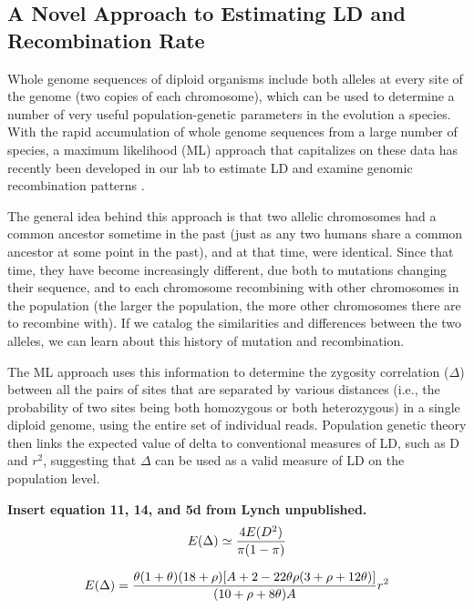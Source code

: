 \documentclass{sig-alternate}
\begin{document}
\subsection{ A Novel Approach to Estimating LD and Recombination Rate}\label{sec:migration}

Whole genome sequences of diploid organisms include both alleles at every site of the genome (two copies of each chromosome), which can be used to determine a number of very useful population-genetic parameters in the evolution a species. With the rapid accumulation of whole genome sequences from a large number of species, a maximum likelihood (ML) approach that capitalizes on these data has recently been developed in our lab to estimate LD and examine genomic recombination patterns \cite{Lynch01112008,MEC:MEC4482}.

The general idea behind this approach is that two allelic chromosomes had a common ancestor sometime in the past (just as any two humans share a common ancestor at some point in the past), and at that time, were identical. Since that time, they have become increasingly different, due both to mutations changing their sequence, and to each chromosome recombining with other chromosomes in the population (the larger the population, the more other chromosomes there are to recombine with). If we catalog the similarities and differences between the two alleles, we can learn about this history of mutation and recombination. 

The ML approach uses this information to determine the zygosity correlation ($\Delta$) between all the pairs of sites that are separated by various distances (i.e., the probability of two sites being both homozygous or both heterozygous) in a single diploid genome, using the entire set of individual reads. Population genetic theory then links the expected value of delta to conventional measures of LD, such as D and $r^2$, suggesting that $\Delta$ can be used as a valid measure of LD on the population level.

{\center \bf Insert equation 11, 14, and 5d from Lynch unpublished.}
\begin{eqnarray}
E(\Delta) \simeq {4E(D^2)\over \pi(1-\pi)}
\label{eq:edelta}
\end{eqnarray}

 \begin{eqnarray}
E(\Delta) = {{\theta(1+\theta)(18+\rho)[A+2-22\theta \rho(3+\rho+12\theta)]} \over {(10+\rho+8\theta)A}}r^2
\label{eq:edelta}
\end{eqnarray}
\end{document}
